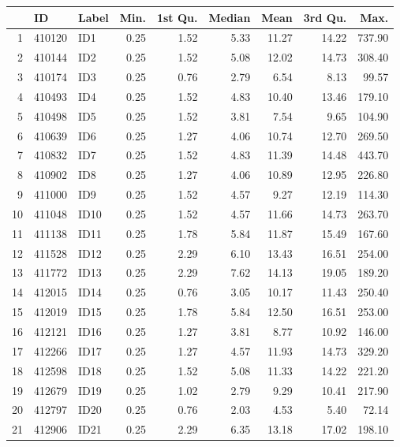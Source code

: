 \documentclass[12pt]{article}\usepackage[]{graphicx}\usepackage[]{color}
\begin{document}
\begin{table}[ht]
\centering
{\tiny
\begin{tabular}{rllrrrrrr}
  \toprule
 & ID & Label & Min. & 1st Qu. & Median & Mean & 3rd Qu. & Max. \\ 
  \midrule
1 & 410120 & ID1 & 0.25 & 1.52 & 5.33 & 11.27 & 14.22 & 737.90 \\ 
  2 & 410144 & ID2 & 0.25 & 1.52 & 5.08 & 12.02 & 14.73 & 308.40 \\ 
  3 & 410174 & ID3 & 0.25 & 0.76 & 2.79 & 6.54 & 8.13 & 99.57 \\ 
  4 & 410493 & ID4 & 0.25 & 1.52 & 4.83 & 10.40 & 13.46 & 179.10 \\ 
  5 & 410498 & ID5 & 0.25 & 1.52 & 3.81 & 7.54 & 9.65 & 104.90 \\ 
  6 & 410639 & ID6 & 0.25 & 1.27 & 4.06 & 10.74 & 12.70 & 269.50 \\ 
  7 & 410832 & ID7 & 0.25 & 1.52 & 4.83 & 11.39 & 14.48 & 443.70 \\ 
  8 & 410902 & ID8 & 0.25 & 1.27 & 4.06 & 10.89 & 12.95 & 226.80 \\ 
  9 & 411000 & ID9 & 0.25 & 1.52 & 4.57 & 9.27 & 12.19 & 114.30 \\ 
  10 & 411048 & ID10 & 0.25 & 1.52 & 4.57 & 11.66 & 14.73 & 263.70 \\ 
  11 & 411138 & ID11 & 0.25 & 1.78 & 5.84 & 11.87 & 15.49 & 167.60 \\ 
  12 & 411528 & ID12 & 0.25 & 2.29 & 6.10 & 13.43 & 16.51 & 254.00 \\ 
  13 & 411772 & ID13 & 0.25 & 2.29 & 7.62 & 14.13 & 19.05 & 189.20 \\ 
  14 & 412015 & ID14 & 0.25 & 0.76 & 3.05 & 10.17 & 11.43 & 250.40 \\ 
  15 & 412019 & ID15 & 0.25 & 1.78 & 5.84 & 12.50 & 16.51 & 253.00 \\ 
  16 & 412121 & ID16 & 0.25 & 1.27 & 3.81 & 8.77 & 10.92 & 146.00 \\ 
  17 & 412266 & ID17 & 0.25 & 1.27 & 4.57 & 11.93 & 14.73 & 329.20 \\ 
  18 & 412598 & ID18 & 0.25 & 1.52 & 5.08 & 11.33 & 14.22 & 221.20 \\ 
  19 & 412679 & ID19 & 0.25 & 1.02 & 2.79 & 9.29 & 10.41 & 217.90 \\ 
  20 & 412797 & ID20 & 0.25 & 0.76 & 2.03 & 4.53 & 5.40 & 72.14 \\ 
  21 & 412906 & ID21 & 0.25 & 2.29 & 6.35 & 13.18 & 17.02 & 198.10 \\ 

\end{tabular}}
\end{table}
\end{document}

